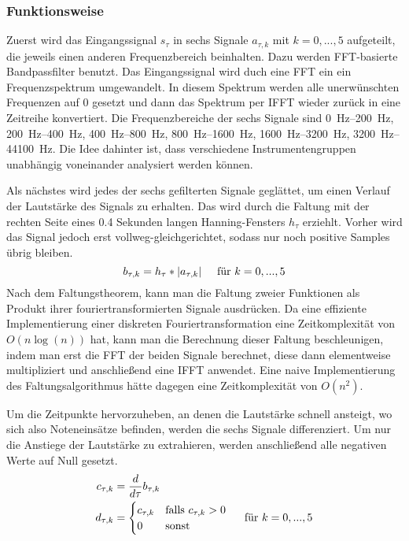 {{		\subsubsection*{Funktionsweise}
		{
			Zuerst wird das Eingangssignal $s_\tau$ in sechs Signale $a_{\tau, k}$ mit $k = 0, ..., 5$ aufgeteilt,
				die jeweils einen anderen Frequenzbereich beinhalten.
			Dazu werden FFT-basierte Bandpassfilter benutzt.
			Das Eingangssignal wird duch eine FFT ein ein Frequenzspektrum umgewandelt.
			In diesem Spektrum werden alle unerwünschten Frequenzen auf \num{0} gesetzt
				und dann das Spektrum per IFFT wieder zurück in eine Zeitreihe konvertiert.
			Die Frequenzbereiche der sechs Signale sind
				\SIrange{0}{200}{\hertz}, \SIrange{200}{400}{\hertz},
				\SIrange{400}{800}{\hertz}, \SIrange{800}{1600}{\hertz},
				\SIrange{1600}{3200}{\hertz}, \SIrange{3200}{44100}{\hertz}.
			Die Idee dahinter ist,
				dass verschiedene Instrumentengruppen unabhängig voneinander analysiert werden können.

			Als nächstes wird jedes der sechs gefilterten Signale geglättet,
				um einen Verlauf der Lautstärke des Signals zu erhalten.
			Das wird durch die Faltung mit der rechten Seite eines \num{0.4} Sekunden langen Hanning-Fensters $h_\tau$ erziehlt.
			Vorher wird das Signal jedoch erst vollweg-gleichgerichtet,
				sodass nur noch positive Samples übrig bleiben.
			\begin{equation}
				b_{\tau, k} = h_\tau * |a_{\tau, k}| \text{\hspace{5mm}für } k = 0, ..., 5
			\end{equation}
			Nach dem Faltungstheorem,
				kann man die Faltung zweier Funktionen als Produkt ihrer fouriertransformierten Signale ausdrücken.
			Da eine effiziente Implementierung einer diskreten Fouriertransformation eine Zeitkomplexität von $O(n\log(n))$ hat,
				kann man die Berechnung dieser Faltung beschleunigen,
				indem man erst die FFT der beiden Signale berechnet,
				diese dann elementweise multipliziert
				und anschließend eine IFFT anwendet.
			Eine naive Implementierung des Faltungsalgorithmus hätte dagegen eine Zeitkomplexität von $O(n^2)$.

			Um die Zeitpunkte hervorzuheben,
				an denen die Lautstärke schnell ansteigt,
				wo sich also Noteneinsätze befinden,
				werden die sechs Signale differenziert.
			Um nur die Anstiege der Lautstärke zu extrahieren,
				werden anschließend alle negativen Werte auf Null gesetzt.
			\begin{align}
				c_{\tau, k} &= \frac{d}{d\tau} b_{\tau, k} \\
				d_{\tau, k} &=
					\begin{cases}
						c_{\tau, k} & \text{falls } c_{\tau, k} > 0 \\
						0           & \text{sonst}
					\end{cases}
					\text{\hspace{5mm}für } k = 0, ..., 5
			\end{align}

}}}
